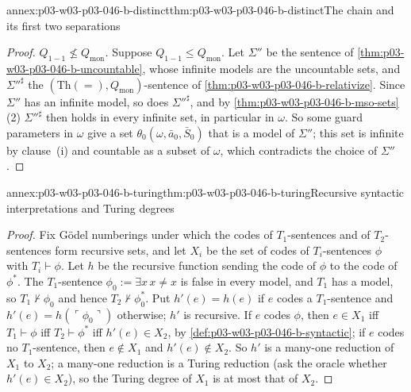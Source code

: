 \begin{annexitem}{annex:p03-w03-p03-046-b-distinct}{thm:p03-w03-p03-046-b-distinct}{The chain and its first two separations}
\begin{proof}
\emph{\(Q_{1-1}\not\le Q_{\mathrm{mon}}\).} Suppose
\(Q_{1-1}\le Q_{\mathrm{mon}}\). Let \(\Sigma''\) be the sentence of
\cref{thm:p03-w03-p03-046-b-uncountable}, whose infinite models are the
uncountable sets, and \(\Sigma''^\sharp\) the
\((\mathrm{Th}(=),Q_{\mathrm{mon}})\)-sentence of
\cref{thm:p03-w03-p03-046-b-relativize}. Since \(\Sigma''\) has an infinite
model, so does \(\Sigma''^\sharp\), and by
\cref{thm:p03-w03-p03-046-b-mso-sets}(2) \(\Sigma''^\sharp\) then holds in
every infinite set, in particular in \(\omega\). So some guard parameters
in \(\omega\) give a set \(\theta_0(\omega,\bar a_0,\bar S_0)\) that is a
model of \(\Sigma''\); this set is infinite by clause~(i) and countable as a
subset of \(\omega\), which contradicts the choice of \(\Sigma''\).
\end{proof}
\end{annexitem}

\begin{annexitem}{annex:p03-w03-p03-046-b-turing}{thm:p03-w03-p03-046-b-turing}{Recursive syntactic interpretations and Turing degrees}
\begin{proof}
Fix G\"odel numberings under which the codes of \(T_1\)-sentences and of
\(T_2\)-sentences form recursive sets, and let \(X_i\) be the set of codes
of \(T_i\)-sentences \(\phi\) with \(T_i\vdash\phi\). Let \(h\) be the
recursive function sending the code of \(\phi\) to the code of \(\phi^*\).
The \(T_1\)-sentence \(\phi_0:=\exists x\,x\neq x\) is false in every
model, and \(T_1\) has a model, so \(T_1\nvdash\phi_0\) and hence
\(T_2\nvdash\phi_0^*\). Put \(h'(e)=h(e)\) if \(e\) codes a
\(T_1\)-sentence and \(h'(e)=h(\ulcorner\phi_0\urcorner)\) otherwise; \(h'\)
is recursive. If \(e\) codes \(\phi\), then \(e\in X_1\) iff
\(T_1\vdash\phi\) iff \(T_2\vdash\phi^*\) iff \(h'(e)\in X_2\), by
\cref{def:p03-w03-p03-046-b-syntactic}; if \(e\) codes no \(T_1\)-sentence,
then \(e\notin X_1\) and \(h'(e)\notin X_2\). So \(h'\) is a many-one
reduction of \(X_1\) to \(X_2\); a many-one reduction is a Turing
reduction (ask the oracle whether \(h'(e)\in X_2\)), so the Turing degree
of \(X_1\) is at most that of \(X_2\).
\end{proof}
\end{annexitem}

